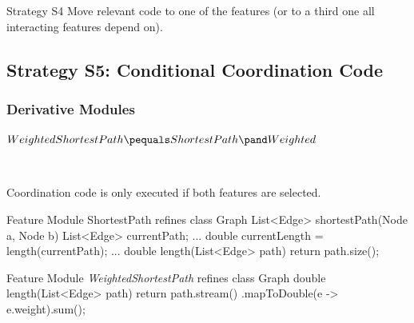 \begin{frame}{\myframetitle}
	\begin{fancycolumns}[widths={30},animation=none]
		\begin{definition}{Strategy S4}
			Move relevant code to one of the features (or to a third one all interacting features depend on).
		\end{definition}
		\nextcolumn
	\end{fancycolumns}
\end{frame}


\subsection{Strategy S5: Conditional Coordination Code}


\subsubsection*{Derivative Modules}

\begin{frame}[fragile]{\myframetitle{}}
	\begin{fancycolumns}[animation=none]
		\centering

	$WeightedShortestPath \pequals ShortestPath \pand Weighted$
		
		~
		\begin{note}{}
			Coordination code is only executed if both features are selected.
		\end{note}
		\nextcolumn
\begin{codetight}{Feature Module ShortestPath}
	refines class Graph {
		List<Edge> shortestPath(Node a, Node b){
			List<Edge> currentPath;
			... 
			double currentLength = length(currentPath);
			... 
		}
		double length(List<Edge> path) {
			return path.size();
		}
	}
\end{codetight}	
\begin{codetight}{Feature Module \emph{WeightedShortestPath}}
	refines class Graph {
		double length(List<Edge> path){
			return path.stream()
			.mapToDouble(e -> e.weight).sum();
		}
	}
\end{codetight}	
	\end{fancycolumns}
\end{frame}

